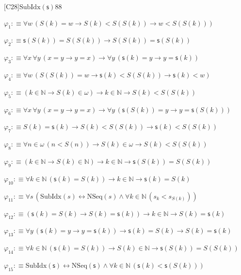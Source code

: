 \begin{fullproof}{[C28]}{$\mathrm{SubIdx}(\mathsf{s})$}{88}
\begin{ptree}
\noLine
{}
\end{ptree}
\begin{abbrevlist}
\item $\varphi_{1} :\equiv \forall w\,(S(k) = w \to S(k) < S(S(k)) \to w < S(S(k)))$
\item $\varphi_{2} :\equiv \mathsf{s}(S(k)) = S(S(k)) \to S(S(k)) = \mathsf{s}(S(k))$
\item $\varphi_{3} :\equiv \forall x\,\forall y\,(x = y \to y = x) \to \forall y\,(\mathsf{s}(k) = y \to y = \mathsf{s}(k))$
\item $\varphi_{4} :\equiv \forall w\,(S(S(k)) = w \to \mathsf{s}(k) < S(S(k)) \to \mathsf{s}(k) < w)$
\item $\varphi_{5} :\equiv (k \in \mathbb{N} \to S(k) \in \omega) \to k \in \mathbb{N} \to S(k) < S(S(k))$
\item $\varphi_{6} :\equiv \forall x\,\forall y\,(x = y \to y = x) \to \forall y\,(\mathsf{s}(S(k)) = y \to y = \mathsf{s}(S(k)))$
\item $\varphi_{7} :\equiv S(k) = \mathsf{s}(k) \to S(k) < S(S(k)) \to \mathsf{s}(k) < S(S(k))$
\item $\varphi_{8} :\equiv \forall n \in \omega\,(n < S(n)) \to S(k) \in \omega \to S(k) < S(S(k))$
\item $\varphi_{9} :\equiv (k \in \mathbb{N} \to S(k) \in \mathbb{N}) \to k \in \mathbb{N} \to \mathsf{s}(S(k)) = S(S(k))$
\item $\varphi_{10} :\equiv \forall k \in \mathbb{N}\,(\mathsf{s}(k) = S(k)) \to k \in \mathbb{N} \to \mathsf{s}(k) = S(k)$
\item $\varphi_{11} :\equiv \forall s\,(\mathrm{SubIdx}(s) \leftrightarrow \mathrm{NSeq}(s) \land \forall k \in \mathbb{N}\,(s_{k} < s_{S(k)}))$
\item $\varphi_{12} :\equiv (\mathsf{s}(k) = S(k) \to S(k) = \mathsf{s}(k)) \to k \in \mathbb{N} \to S(k) = \mathsf{s}(k)$
\item $\varphi_{13} :\equiv \forall y\,(\mathsf{s}(k) = y \to y = \mathsf{s}(k)) \to \mathsf{s}(k) = S(k) \to S(k) = \mathsf{s}(k)$
\item $\varphi_{14} :\equiv \forall k \in \mathbb{N}\,(\mathsf{s}(k) = S(k)) \to S(k) \in \mathbb{N} \to \mathsf{s}(S(k)) = S(S(k))$
\item $\varphi_{15} :\equiv \mathrm{SubIdx}(\mathsf{s}) \leftrightarrow \mathrm{NSeq}(\mathsf{s}) \land \forall k \in \mathbb{N}\,(\mathsf{s}(k) < \mathsf{s}(S(k)))$

\end{abbrevlist}
\end{fullproof}
